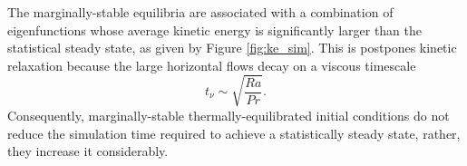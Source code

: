 \documentclass[reprint,amsmath,amssymb,aps]{revtex4-1}
\begin{document}
\par The marginally-stable equilibria are associated with a combination of eigenfunctions whose average kinetic energy is significantly larger than the statistical steady state, as given by Figure \ref{fig:ke_sim}. This is postpones kinetic relaxation because the large horizontal flows decay on a viscous timescale
\begin{equation}
    t_{\nu} \sim \sqrt{\frac{Ra}{Pr}}. \nonumber
\end{equation}
Consequently, marginally-stable thermally-equilibrated initial conditions do not reduce the simulation time required to achieve a statistically steady state, rather, they increase it considerably.
\end{document}
